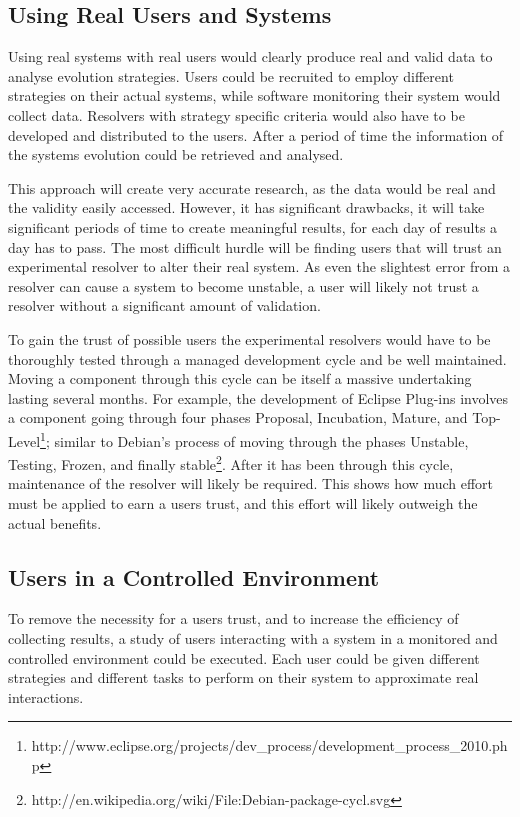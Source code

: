 \subsection{Using Real Users and Systems}
Using real systems with real users would clearly produce real and valid data to analyse evolution strategies.
Users could be recruited to employ different strategies on their actual systems, while software monitoring their system would collect data.
Resolvers with strategy specific criteria would also have to be developed and distributed to the users.
After a period of time the information of the systems evolution could be retrieved and analysed.

This approach will create very accurate research, as the data would be real and the validity easily accessed. 
However, it has significant drawbacks,
it will take significant periods of time to create meaningful results, for each day of results a day has to pass.
The most difficult hurdle will be finding users that will trust an experimental resolver to alter their real system.   
As even the slightest error from a resolver can cause a system to become unstable, a user will likely not trust a resolver without a significant amount of validation.

To gain the trust of possible users the experimental resolvers would have to be thoroughly tested through a managed development cycle and be well maintained.
Moving a component through this cycle can be itself a massive undertaking lasting several months. 
For example, the development of Eclipse Plug-ins involves a component going through four phases 
Proposal, Incubation, Mature, and Top-Level\footnote{http://www.eclipse.org/projects/dev\_process/development\_process\_2010.php};
similar to Debian's process of moving through the phases Unstable, Testing, Frozen, and finally stable\footnote{http://en.wikipedia.org/wiki/File:Debian-package-cycl.svg}.
After it has been through this cycle, maintenance of the resolver will likely be required.
This shows how much effort must be applied to earn a users trust, and this effort will likely outweigh the actual benefits.

\subsection{Users in a Controlled Environment}
To remove the necessity for a users trust, and to increase the efficiency of collecting results, 
a study of users interacting with a system in a monitored and controlled environment could be executed.
Each user could be given different strategies and different tasks to perform on their system to approximate real interactions.

